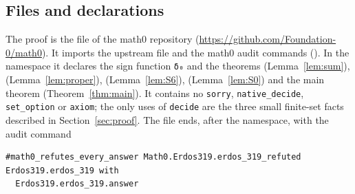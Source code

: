 \documentclass[11pt]{amsart}
\theoremstyle{plain}
\theoremstyle{definition}
\begin{document}
\subsection*{Files and declarations}
The proof is the file  of the math0 repository (\url{https://github.com/Foundation-0/math0}). It imports the upstream file  and the math0 audit commands (). In the namespace  it declares the sign function \texttt{δ₀} and the theorems  (Lemma~\ref{lem:sum}),  (Lemma~\ref{lem:proper}),  (Lemma~\ref{lem:S6}),  (Lemma~\ref{lem:S0}) and the main theorem  (Theorem~\ref{thm:main}). It contains no \texttt{sorry}, \texttt{native\_decide}, \texttt{set\_option} or \texttt{axiom}; the only uses of \texttt{decide} are the three small finite-set facts described in Section~\ref{sec:proof}. The file ends, after the namespace, with the audit command
\begin{lstlisting}
#math0_refutes_every_answer Math0.Erdos319.erdos_319_refuted Erdos319.erdos_319 with
  Erdos319.erdos_319.answer
\end{lstlisting}
\end{document}
